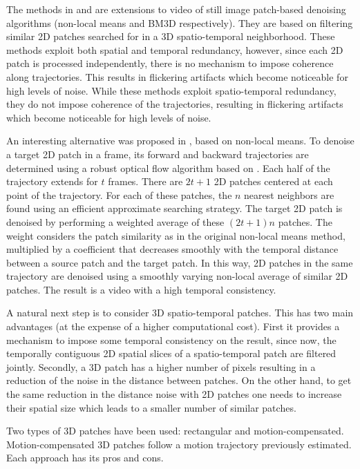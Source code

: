 \documentclass[10pt, journal, twocolumn, final, a4paper]{IEEEtran}
\begin{document}
The methods in \cite{Buades2005v} and \cite{Dabov2007v} are extensions to video
of still image patch-based denoising algorithms (non-local means \cite{Buades2006} and BM3D
\cite{Dabov2007tip} respectively). They are based on filtering similar 2D patches
searched for in a 3D spatio-temporal neighborhood. These methods exploit both
spatial and temporal redundancy, however, since each 2D patch is processed
independently, there is no mechanism to impose coherence along trajectories.
This results in flickering artifacts which become noticeable for high levels of
noise. 
%
While these methods exploit spatio-temporal redundancy, they do not impose
coherence of the trajectories, resulting in flickering
artifacts which become noticeable for high levels of noise. 

An interesting alternative was proposed in \cite{Liu2010},
based on non-local means.
To denoise a target 2D patch in a frame, its forward and backward trajectories are
determined using a robust optical flow algorithm based on \cite{Bruhn2005}. 
Each half of the trajectory extends for $t$ frames. There are $2t + 1$ 2D patches
centered at each point of the trajectory.
For each of these patches, the $n$ nearest neighbors are found
using an efficient approximate searching strategy. The target 2D patch is denoised
by performing a weighted average of these $(2t + 1)n$ patches. The weight considers
the patch similarity as in the original non-local means method, multiplied by a coefficient
that decreases smoothly with the temporal distance between a source patch and the target patch.
%
In this way, 2D patches in the same trajectory are denoised using a smoothly
varying non-local average of similar 2D patches. The result is a video with
a high temporal consistency.

A natural next step is to consider 3D spatio-temporal patches. This has two
main advantages (at the expense of a higher computational cost). First it
provides a mechanism to impose some temporal consistency on the result, since
now, the temporally contiguous 2D spatial slices of a spatio-temporal patch
are filtered jointly. Secondly, a 3D patch has a higher number of pixels
resulting in a reduction of the noise in the distance between patches. On the
other hand, to get the same reduction in the distance noise with 2D patches one
needs to increase their spatial size which leads to a smaller number of similar
patches.

Two types of 3D patches have been used: rectangular and motion-compensated.
Motion-compensated 3D patches follow a motion trajectory previously estimated.
Each approach has its pros and cons.
\end{document}
